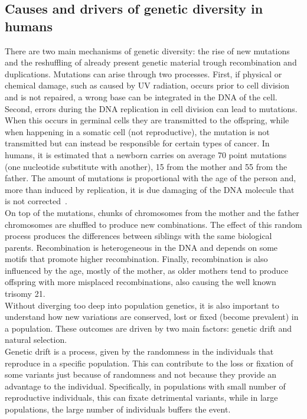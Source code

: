 \subsection{Causes and drivers of genetic diversity in humans}
There are two main mechanisms of genetic diversity: the rise of new mutations and the reshuffling of already present genetic material trough recombination and duplications. Mutations can arise through two processes. First, if physical or chemical damage, such as caused by UV radiation, occurs prior to cell division and is not repaired, a wrong base can be integrated in the DNA of the cell. Second, errors during the DNA replication in cell division can lead to mutations. When this occurs in germinal cells they are transmitted to the offspring, while when happening in a somatic cell (not reproductive), the mutation is not transmitted but can instead be responsible for certain types of cancer. In humans, it is estimated that a newborn carries on average 70 point mutations (one nucleotide substitute with another), 15 from the mother and 55 from the father. The amount of mutations is proportional with the age of the person and, more than induced by replication, it is due damaging of the DNA molecule that is not corrected~\cite{genome_diversity_quintana}.\\
On top of the mutations, chunks of chromosomes from the mother and the father chromosomes are shuffled to produce new combinations. The effect of this random process produces the differences between siblings with the same biological parents. Recombination is heterogeneous in the DNA and depends on some motifs that promote higher recombination. Finally, recombination is also influenced by the age, mostly of the mother, as older mothers tend to produce offspring with more misplaced recombinations, also causing the well known trisomy 21.\\
Without diverging too deep into population genetics, it is also important to understand how new variations are conserved, lost or fixed (become prevalent) in a population. These outcomes are driven by two main factors: genetic drift and natural selection.\\
Genetic drift is a process, given by the randomness in the individuals that reproduce in a specific population. This can contribute to the loss or fixation of some variants just because of randomness and not because they provide an advantage to the individual. Specifically, in populations with small number of reproductive individuals, this can fixate detrimental variants, while in large populations, the large number of individuals buffers the event. \\
